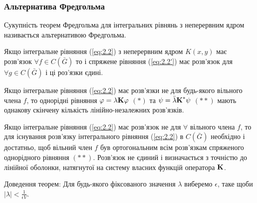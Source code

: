 \subsubsection{Альтернатива Фредгольма}

Сукупність теорем Фредгольма для інтегральних рівнянь з неперервним ядром називається альтернативою Фредгольма.

\begin{theorem}
	Якщо інтегральне рівняння (\ref{eq:2.2}) з неперервним ядром $K(x, y)$ має розв'язок $\forall f \in C(\bar G)$ то і спряжене рівняння (\ref{eq:2.2'}) має розв'язок для $\forall g \in C(\bar G)$ і ці роз'язки єдині.
\end{theorem}
\begin{theorem}
	Якщо інтегральне рівняння (\ref{eq:2.2}) має розв'язки не для будь-якого вільного члена $f$, то однорідні рівняння $\phi = \lambda \bf{K} \phi$ $(*)$ та $\psi = \bar \lambda \bf{K}^* \psi$ $(**)$ мають однакову скінчену кількість лінійно-незалежних розв'язків.
\end{theorem}
\begin{theorem}
	Якщо інтегральне рівняння (\ref{eq:2.2}) має розв'язок не для $\forall$ вільного члена $f$, то для існування розв'язку інтегрального рівняння (\ref{eq:2.2}) в $C(\bar G)$ необхідно і достатньо, щоб вільний член $f$ був ортогональним всім розв'язкам спряженого однорідного рівняння $(**)$. Розв'язок не єдиний і визначається з точністю до лінійної оболонки, натягнутої на систему власних функцій оператора $\bf{K}$.
\end{theorem}

Доведення теорем: Для будь-якого фіксованого значення $\lambda$ виберемо $\epsilon$, таке щоби $|\lambda| < \frac{1}{\epsilon V}$.

